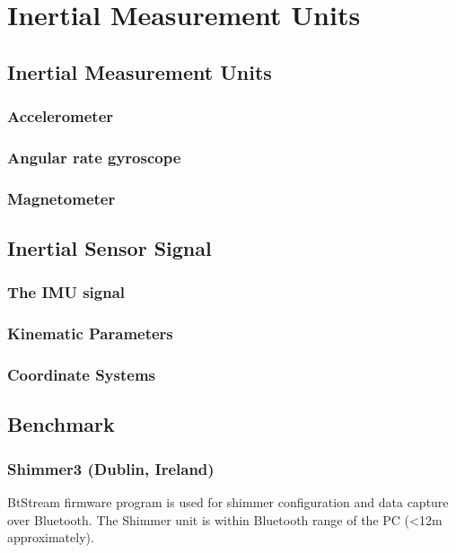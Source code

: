 \chapter{Inertial Measurement Units}


\section*{Inertial Measurement Units}
\subsection*{Accelerometer}
\subsection*{Angular rate gyroscope}
\subsection*{Magnetometer}

\section*{Inertial Sensor Signal}
\subsection*{The IMU signal}
\subsection*{Kinematic Parameters}
\subsection*{Coordinate Systems}



\section*{Benchmark}

\subsection*{Shimmer3 (Dublin, Ireland)}


BtStream firmware program is used for shimmer configuration
and data capture over Bluetooth.
The Shimmer unit is within Bluetooth range of the PC (<12m approximately).

